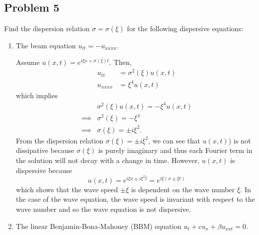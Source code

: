 \documentclass[a4paper,12pt]{article}
\begin{document}
\subsection*{Problem 5}
	Find the dispersion relation $ \sigma = \sigma(\xi) $ for the following dispersive equations:
	\begin{enumerate}[label = \textbf{(\alph*)}]
		\item The beam equation $ u_{tt} = -u_{xxxx} $.
		
		Assume $ u(x,t) = e^{i\xi x + \sigma(\xi)t} $. Then,
		\begin{align*}
			u_{tt}       &= \sigma^2(\xi)u(x,t) \\
			u_{xxxx} &= \xi^4 u(x,t)
		\end{align*}
		which implies
		\begin{align*}
			& \sigma^2(\xi)u(x,t) = -\xi^4 u(x,t) \\
			\implies & \sigma^2(\xi) = -\xi^4 \\
			\implies & \sigma(\xi) = \pm i \xi^2.
		\end{align*}
		From the dispersion relation $ \sigma(\xi) = \pm i \xi^2 $, we can see that $ u(x,t) $) is not dissipative because $ \sigma(\xi) $ is purely imaginary and thus each Fourier term in the solution will not decay with a change in time. However, $ u(x,t) $ is dispersive because 
		\[
			u(x,t) = e^{i \xi x \pm i \xi^2 t} = e^{i \xi (x \pm \xi t)}
		\]
		which shows that the wave speed $ \pm \xi $ is dependent on the wave number $ \xi $. In the case of the wave equation, the wave speed is invariant with respect to the wave number and so the wave equation is not dispersive.
		
		\item The linear Benjamin-Bona-Mahoney (BBM) equation $ u_t + c u_x + \beta u_{xxt} = 0 $.
		

\end{enumerate}
\end{document}
